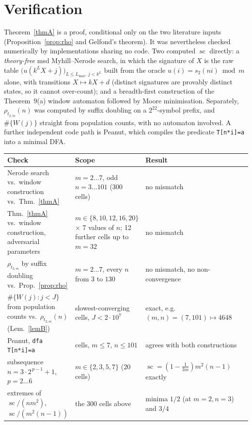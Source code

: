 \documentclass[10pt,reqno]{amsart}
\theoremstyle{plain}
\theoremstyle{definition}
\theoremstyle{remark}
\numberwithin{theorem}{section}
\DeclareMathOperator{\sco}{sc}
\newcommand{\tm}{t_{2,m}}
\begin{document}
\section{Verification}\label{sec:verify}
\label{sec:verif}

Theorem~\ref{thmA} is a proof, conditional only on the two literature inputs
(Proposition~\ref{prop:rho} and Gelfond's theorem). It was nevertheless checked numerically
by implementations sharing no code. Two computed $\sco$ directly: a \emph{theory-free} msd
Myhill--Nerode search, in which the signature of $X$ is the raw table
$\bigl(u(k^L X + j)\bigr)_{L \le L_{\max},\, j < k^L}$ built from the oracle
$u(i) = s_2(ni) \bmod m$ alone, with transitions $X \mapsto kX + d$ (distinct signatures are
provably distinct states, so it cannot over-count); and a breadth-first construction of the
Theorem~9(a) window automaton followed by Moore minimisation. Separately, $\rho_{\tm}(n)$
was computed by suffix doubling on a $2^{22}$-symbol prefix, and $\#\{W(j)\}$ straight from
population counts, with no automaton involved. A further independent code path is Peanut,
which compiles the predicate \verb|T[n*i]=a| into a minimal DFA.

\begin{center}\footnotesize
\begin{tabular}{@{}>{\raggedright\arraybackslash}p{5.5cm}>{\raggedright\arraybackslash}p{5.9cm}>{\raggedright\arraybackslash}p{5.4cm}@{}}
\toprule
Check & Scope & Result \\
\midrule
Nerode search vs.\ window construction vs.\ Thm.~\ref{thmA}
  & $m = 2 \dots 7$, odd $n = 3 \dots 101$ (300 cells)
  & no mismatch \\
Thm.~\ref{thmA} vs.\ window construction, adversarial parameters
  & $m \in \{8,10,12,16,20\}$ $\times$ 7 values of $n$; 12 further cells up to $m = 32$
  & no mismatch \\
$\rho_{\tm}$ by suffix doubling vs.\ Prop.~\ref{prop:rho}
  & $m = 2 \dots 7$, every $n$ from $3$ to $130$
  & no mismatch, no non-convergence \\
$\#\{W(j) : j < J\}$ from population counts vs.\ $\rho_{\tm}(n)$ (Lem.~\ref{lemB})
  & slowest-converging cells, $J < 2\cdot10^{7}$
  & exact, e.g.\ $(m,n) = (7,101) \mapsto 4648$ \\
Peanut, \verb|dfa T[n*i]=a|
  & 14 cells, $m \le 7$, $n \le 101$
  & agrees with both constructions \\
subsequence $n = 3\cdot2^{\,p-1}+1$, $p = 2 \dots 6$
  & $m \in \{2,3,5,7\}$ (20 cells)
  & $\sco = (1-\tfrac1{3m})m^2(n-1)$ exactly \\
extremes of $\sco/(nm^2)$, $\sco/(m^2(n-1))$
  & the 300 cells above
  & minima $1/2$ (at $m=2,n=3$) and $3/4$ \\
\bottomrule
\end{tabular}
\end{center}
\end{document}
